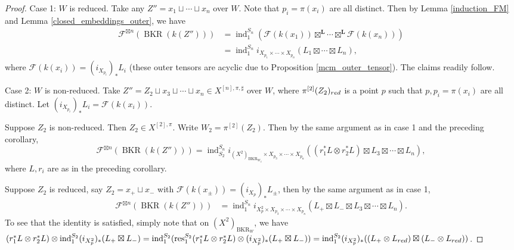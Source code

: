 \documentclass[10pt,a4paper]{amsart}
\begin{document}
    \begin{proof}
        Case 1: $W$ is reduced.
        Take any $Z''=x_1\sqcup\cdots\sqcup x_n$ over $W$.
        Note that $p_i=\pi(x_i)$ are all distinct.
        Then by Lemma \ref{induction_FM} and Lemma \ref{closed_embeddings_outer}, we have
        \begin{align*}
            \mathcal F^{\boxtimes n}(\operatorname{BKR}(k(Z'')))&=\operatorname{ind}_1^{S_n}(\mathcal F(k(x_1))\boxtimes^{\mathbf L}\cdots\boxtimes^{\mathbf L}\mathcal F(k(x_n)))\\
            &=\operatorname{ind}_1^{S_n}i_{X_{p_1}\times\cdots\times X_{p_n}}(L_1\boxtimes\cdots\boxtimes L_n),
        \end{align*}
        where $\mathcal F(k(x_i))=(i_{X_{p_i}})_\ast L_i$ (these outer tensors are acyclic due to Proposition \ref{mcm_outer_tensor}).
        The claims readily follow.

        Case 2: $W$ is non-reduced.
        Take $Z''=Z_2\sqcup x_3\sqcup\cdots\sqcup x_n\in X^{[n],\pi,\sharp}$ over $W$, where $\pi^{[2]}(Z_2)_{\rm red}$ is a point $p$ such that $p,p_i=\pi(x_i)$ are all distinct.
        Let $(i_{X_{p_i}})_\ast L_i=\mathcal F(k(x_i))$.

        Suppose $Z_2$ is non-reduced.
        Then $Z_2\in X^{[2],\pi}$.
        Write $W_2=\pi^{[2]}(Z_2)$.
        Then by the same argument as in case 1 and the preceding corollary,
        \[\mathcal F^{\boxtimes n}(\operatorname{BKR}(k(Z'')))=\operatorname{ind}_{S_2}^{S_n}i_{(X^2)_{\operatorname{BKR}_{W_2}}\times X_{p_3}\times\cdots\times X_{p_n}}((r_1^\ast L\otimes r_2^\ast L)\boxtimes L_3\boxtimes\cdots\boxtimes L_n),\]
        where $L,r_i$ are as in the preceding corollary.

        Suppose $Z_2$ is reduced, say $Z_2=x_+\sqcup x_-$ with $\mathcal F(k(x_{\pm}))=(i_{X_p})_\ast L_\pm$, then by the same argument as in case 1,
        \begin{align*}
            \mathcal F^{\boxtimes n}(\operatorname{BKR}(k(Z'')))&=\operatorname{ind}_1^{S_n}i_{X_p^2\times X_{p_3}\times\cdots\times X_{p_n}}(L_+\boxtimes L_-\boxtimes L_3\boxtimes\cdots\boxtimes L_n).
        \end{align*}
        To see that the identity is satisfied, simply note that on $(X^2)_{\operatorname{BKR}_W}$, we have $(r_1^\ast L\otimes r_2^\ast L)\otimes\operatorname{ind}_1^{S_2}(i_{X_p^2})_\ast (L_+\boxtimes L_-)=\operatorname{ind}_1^{S_2}(\operatorname{res}_1^{S_2}(r_1^\ast L\otimes r_2^\ast L)\otimes (i_{X_p^2})_\ast (L_+\boxtimes L_-))=\operatorname{ind}_1^{S_2}(i_{X_p^2})_\ast((L_+\otimes L_{\rm red})\boxtimes (L_-\otimes L_{\rm red}))$.
    \end{proof}
\end{document}

